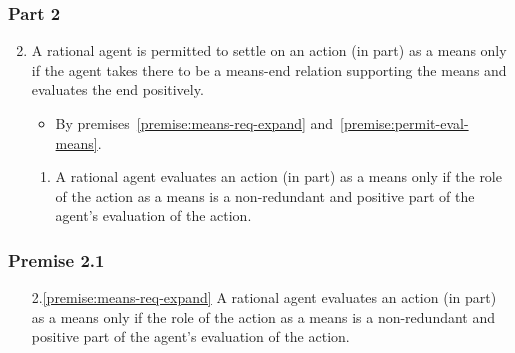 \documentclass[noamssymb,
]{beamer} %
\newcommand{\hozlinedash}[0]{
  \noindent\hdashrule[0.5ex][c]{\textwidth}{.1pt}{2.5pt}
}
\begin{document}
\begin{frame}
  \frametitle{Part 2}

  \begin{enumerate}
    \setcounter{enumi}{1}
\item A rational agent is permitted to settle on an action (in part) as a means only if the agent takes there to be a means-end relation supporting the means and evaluates the end positively.
  \begin{itemize}
  \item By premises~\ref{premise:means-req-expand} and~\ref{premise:permit-eval-means}.
  \end{itemize}
  \begin{enumerate}
  \item\label{premise:means-req-expand} A rational agent evaluates an action (in part) as a means only if the role of the action as a means is a non-redundant and positive part of the agent’s evaluation of the action.
  \end{enumerate}
\end{enumerate}

\end{frame}

\begin{frame}
  \frametitle{Premise 2.1}

  \begin{enumerate}
  \item[2.\ref{premise:means-req-expand}] A rational agent evaluates an action (in part) as a means only if the role of the action as a means is a non-redundant and positive part of the agent’s evaluation of the action.
  \end{enumerate}

  \hozlinedash
\end{frame}
\end{document}
